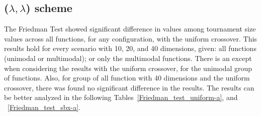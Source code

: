 

\subsection{($\lambda, \lambda$) scheme}


The Friedman Test showed significant difference in values among tournament size values across all functions, for any configuration, with the uniform crossover. This results hold for every scenario with 10, 20, and 40 dimensions, given: all functions (unimodal or multimodal); or only the multimodal functions. There is an except when considering the results with the uniform crossover, for the unimodal group of functions. Also, for group of all function with 40 dimensions and the uniform crossover, there was found no significant difference in the results. The results can be better analyzed in the following Tables~\ref{Friedman_test_uniform-a}, and ~\ref{Friedman_test_sbx-a}.


